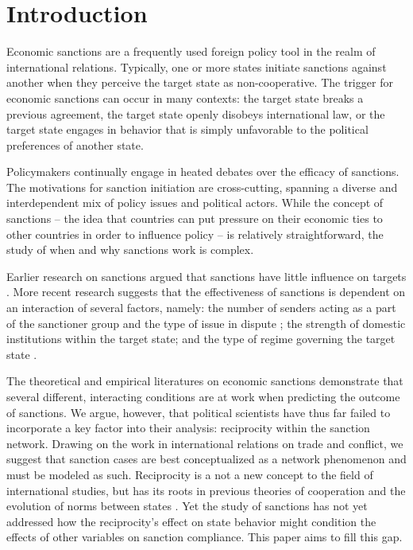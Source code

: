 \section*{Introduction}
\label{intro}

Economic sanctions are a frequently used foreign policy tool in the realm of international relations. Typically, one or more states initiate sanctions against another when they perceive the target state as non-cooperative. The trigger for economic sanctions can occur in many contexts: the target state breaks a previous agreement, the target state openly disobeys international law, or the target state engages in behavior that is simply unfavorable to the political preferences of another state. 

Policymakers continually engage in heated debates over the efficacy of sanctions. The motivations for sanction initiation are cross-cutting, spanning a diverse and interdependent mix of policy issues and political actors. While the concept of sanctions -- the idea that countries can put pressure on their economic ties to other countries in order to influence policy -- is relatively straightforward, the study of when and why sanctions work is complex. 

Earlier research on sanctions argued that sanctions have little influence on targets \citep{lam1990, dashti1997, morgan1997, drezner1998}. More recent research suggests that the effectiveness of sanctions is dependent on an interaction of several factors, namely: the number of senders acting as a part of the sanctioner group and the type of issue in dispute \citep{miers2002, morgan2009threat}; the strength of domestic institutions within the target state; and the type of regime governing the target state \citep{mcgillivray2004}. 

The theoretical and empirical literatures on economic sanctions demonstrate that several different, interacting conditions are at work when predicting the outcome of sanctions. We argue, however, that political scientists have thus far failed to incorporate a key factor into their analysis: reciprocity within the sanction network. Drawing on the work in international relations on trade and conflict, we suggest that sanction cases are best conceptualized as a network phenomenon and must be modeled as such. Reciprocity is a not a new concept to the field of international studies, but has its roots in previous theories of cooperation and the evolution of norms between states \citep{keohane1989reciprocity,goldstein1991reciprocity,rajmaira1990evolving,ward1992reciprocity}. Yet the study of sanctions has not yet addressed how the reciprocity's effect on state behavior might condition the effects of other variables on sanction compliance. This paper aims to fill this gap.

